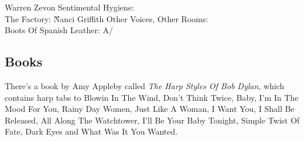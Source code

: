 Warren Zevon Sentimental Hygiene: \\ The Factory: \G


Nanci Griffith Other Voices, Other Rooms: \\ Boots Of Spanish
Leather: A/\D
\subsection*{Books}

There's a book by Amy Appleby called \emph{The Harp Styles Of Bob
Dylan}, which contains harp tabs to Blowin In The Wind, Don't Think
Twice, Baby, I'm In The Mood For You, Rainy Day Women, Just Like A
Woman, I Want You, I Shall Be Released, All Along The Watchtower, I'll
Be Your Baby Tonight, Simple Twist Of Fate, Dark Eyes and What Was It
You Wanted.





